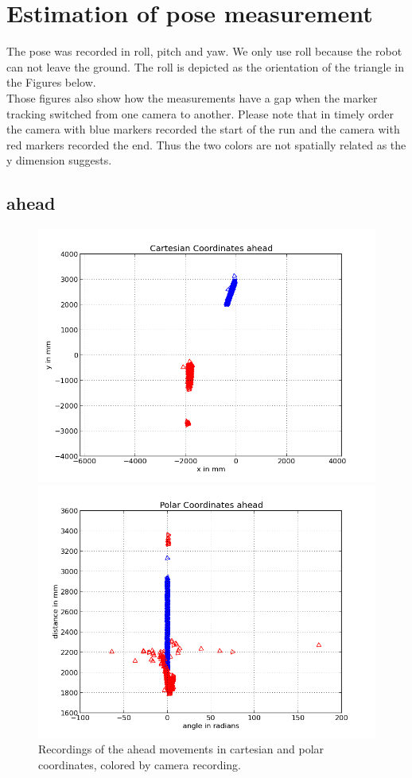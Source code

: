 \documentclass{scrartcl}
\begin{document}
\section{Estimation of pose measurement}
The pose was recorded in roll, pitch and yaw. We only use roll because the robot can not leave the ground. The roll is depicted as the orientation of the triangle in the Figures below.\\
Those figures also show how the measurements have a gap when the marker tracking switched from one camera to another. Please note that in timely order the camera with blue markers recorded the start of the run and the camera with red markers recorded the end. Thus the two colors are not spatially related as the y dimension suggests.

\subsection{ahead}
\begin{figure}[H]
\centering
\begin{minipage}{.5\textwidth}
  \centering
  \includegraphics[width=.8\linewidth]{img/ahead_n.png}
\end{minipage}%
\begin{minipage}{.5\textwidth}
  \centering
  \includegraphics[width=.8\linewidth]{img/ahead_pc_n.png}
\end{minipage}
\caption{Recordings of the ahead movements in cartesian and polar coordinates, colored by camera recording.}
\label{fig:ahead}
\end{figure}
\end{document}
